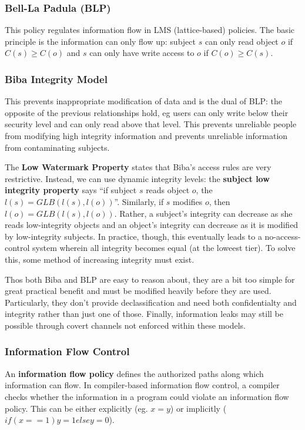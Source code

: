 \documentclass[12pt]{article}
\begin{document}
\subsubsection{Bell-La Padula (BLP)}
This policy regulates information flow in LMS (lattice-based) policies. The basic principle is the information can only flow up: subject $s$ can only read object $o$ if $C(s) \geq C(o)$ and $s$ can only have write access to $o$ if $C(o) \geq C(s)$.

\subsubsection{Biba Integrity Model}
This prevents inappropriate modification of data and is the dual of BLP: the opposite of the previous relationships hold, eg users can only write below their security level and can only read above that level. This prevents unreliable people from modifying high integrity information and prevents unreliable information from contaminating subjects.

The {\bf Low Watermark Property} states that Biba's access rules are very restrictive. Instead, we can use dynamic integrity levels: the {\bf subject low integrity property} says ``if subject $s$ reads object $o$, the $l(s) = GLB(l(s), l(o))$''. Similarly, if $s$ modifies $o$, then $l(o) = GLB(l(s), l(o))$. Rather, a subject's integrity can decrease as she reads low-integrity objects and an object's integrity can decrease as it is modified by low-integrity subjects. In practice, though, this eventually leads to a no-access-control system wherein all integrity becomes equal (at the loweest tier). To solve this, some method of increasing integrity must exist.

Thos both Biba and BLP are easy to reason about, they are a bit too simple for great practical benefit and must be modified heavily before they are used. Particularly, they don't provide declassification and need both confidentialty and integrity rather than just one of those. Finally, information leaks may still be possible through covert channels not enforced within these models.

\subsubsection{Information Flow Control}
An {\bf information flow policy} defines the authorized paths along which information can flow. In compiler-based information flow control, a compiler checks whether the information in a program could violate an information flow policy. This can be either explicitly (eg. $x = y$) or implicitly ($if (x == 1) { y = 1 } else { y = 0 }$).
\end{document}

